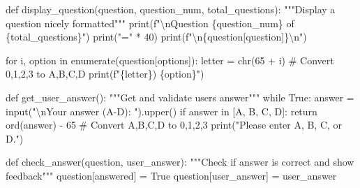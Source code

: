 \documentclass[
  letterpaper,
  DIV=11,
  numbers=noendperiod,
  oneside]{scrreprt}
\newenvironment{Shaded}{}{}
\newcommand{\BuiltInTok}[1]{\textcolor[rgb]{0.84,0.23,0.29}{#1}}
\newcommand{\CharTok}[1]{\textcolor[rgb]{0.01,0.18,0.38}{#1}}
\newcommand{\CommentTok}[1]{\textcolor[rgb]{0.42,0.45,0.49}{#1}}
\newcommand{\ControlFlowTok}[1]{\textcolor[rgb]{0.84,0.23,0.29}{#1}}
\newcommand{\DecValTok}[1]{\textcolor[rgb]{0.00,0.36,0.77}{#1}}
\newcommand{\KeywordTok}[1]{\textcolor[rgb]{0.84,0.23,0.29}{#1}}
\newcommand{\NormalTok}[1]{\textcolor[rgb]{0.14,0.16,0.18}{#1}}
\newcommand{\OperatorTok}[1]{\textcolor[rgb]{0.14,0.16,0.18}{#1}}
\newcommand{\SpecialCharTok}[1]{\textcolor[rgb]{0.00,0.36,0.77}{#1}}
\newcommand{\SpecialStringTok}[1]{\textcolor[rgb]{0.01,0.18,0.38}{#1}}
\newcommand{\StringTok}[1]{\textcolor[rgb]{0.01,0.18,0.38}{#1}}
\newcommand{\VariableTok}[1]{\textcolor[rgb]{0.89,0.38,0.04}{#1}}
\begin{document}
\begin{Shaded}
\begin{Highlighting}[]
\KeywordTok{def}\NormalTok{ display\_question(question, question\_num, total\_questions):}
    \CommentTok{"""Display a question nicely formatted"""}
    \BuiltInTok{print}\NormalTok{(}\SpecialStringTok{f"}\CharTok{\textbackslash{}n}\SpecialStringTok{Question }\SpecialCharTok{\{}\NormalTok{question\_num}\SpecialCharTok{\}}\SpecialStringTok{ of }\SpecialCharTok{\{}\NormalTok{total\_questions}\SpecialCharTok{\}}\SpecialStringTok{"}\NormalTok{)}
    \BuiltInTok{print}\NormalTok{(}\StringTok{"="} \OperatorTok{*} \DecValTok{40}\NormalTok{)}
    \BuiltInTok{print}\NormalTok{(}\SpecialStringTok{f"}\CharTok{\textbackslash{}n}\SpecialCharTok{\{}\NormalTok{question[}\StringTok{\textquotesingle{}question\textquotesingle{}}\NormalTok{]}\SpecialCharTok{\}}\CharTok{\textbackslash{}n}\SpecialStringTok{"}\NormalTok{)}
    
    \ControlFlowTok{for}\NormalTok{ i, option }\KeywordTok{in} \BuiltInTok{enumerate}\NormalTok{(question[}\StringTok{\textquotesingle{}options\textquotesingle{}}\NormalTok{]):}
\NormalTok{        letter }\OperatorTok{=} \BuiltInTok{chr}\NormalTok{(}\DecValTok{65} \OperatorTok{+}\NormalTok{ i)  }\CommentTok{\# Convert 0,1,2,3 to A,B,C,D}
        \BuiltInTok{print}\NormalTok{(}\SpecialStringTok{f"}\SpecialCharTok{\{}\NormalTok{letter}\SpecialCharTok{\}}\SpecialStringTok{) }\SpecialCharTok{\{}\NormalTok{option}\SpecialCharTok{\}}\SpecialStringTok{"}\NormalTok{)}

\KeywordTok{def}\NormalTok{ get\_user\_answer():}
    \CommentTok{"""Get and validate user\textquotesingle{}s answer"""}
    \ControlFlowTok{while} \VariableTok{True}\NormalTok{:}
\NormalTok{        answer }\OperatorTok{=} \BuiltInTok{input}\NormalTok{(}\StringTok{"}\CharTok{\textbackslash{}n}\StringTok{Your answer (A{-}D): "}\NormalTok{).upper()}
        \ControlFlowTok{if}\NormalTok{ answer }\KeywordTok{in}\NormalTok{ [}\StringTok{\textquotesingle{}A\textquotesingle{}}\NormalTok{, }\StringTok{\textquotesingle{}B\textquotesingle{}}\NormalTok{, }\StringTok{\textquotesingle{}C\textquotesingle{}}\NormalTok{, }\StringTok{\textquotesingle{}D\textquotesingle{}}\NormalTok{]:}
            \ControlFlowTok{return} \BuiltInTok{ord}\NormalTok{(answer) }\OperatorTok{{-}} \DecValTok{65}  \CommentTok{\# Convert A,B,C,D to 0,1,2,3}
        \BuiltInTok{print}\NormalTok{(}\StringTok{"Please enter A, B, C, or D."}\NormalTok{)}

\KeywordTok{def}\NormalTok{ check\_answer(question, user\_answer):}
    \CommentTok{"""Check if answer is correct and show feedback"""}
\NormalTok{    question[}\StringTok{\textquotesingle{}answered\textquotesingle{}}\NormalTok{] }\OperatorTok{=} \VariableTok{True}
\NormalTok{    question[}\StringTok{\textquotesingle{}user\_answer\textquotesingle{}}\NormalTok{] }\OperatorTok{=}\NormalTok{ user\_answer}
    

\end{Highlighting}
\end{Shaded}
\end{document}

